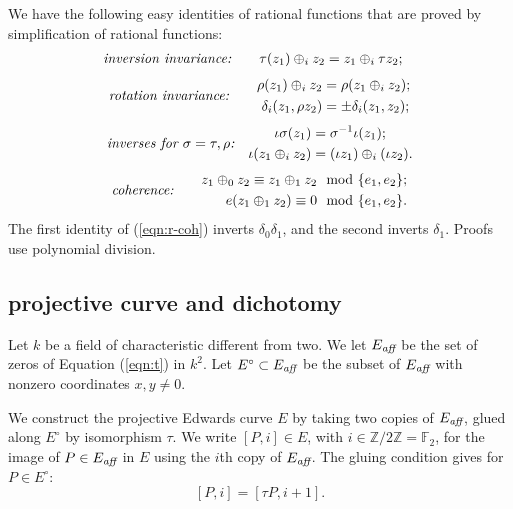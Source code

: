 \documentclass{llncs}
\newcommand{\ring}[1]{\mathbb{#1}}
\newcommand{\op}[1]{\hbox{#1}}
\newcommand{\Eaff}{E_{\op{\scriptsize\it aff}}}
\newcommand{\Eoo}{E^{\circ}} %
\begin{document}
We have the following easy identities of rational functions that are
proved by simplification of rational functions:
\begin{align}\label{eqn:r-tau}
\text{\it inversion invariance:}\quad\quad
\tau (z_1)\oplus_i z_2 &= z_1 \oplus_i \tau z_2;
\end{align}
\begin{align}\label{eqn:r-rho}
\text{\it rotation invariance:}\quad\quad
\begin{split}
\rho(z_1)\oplus_i z_2 &= \rho(z_1\oplus_i z_2);\\
\delta_i(z_1,\rho z_2) &= \pm \delta_i(z_1,z_2);
\end{split}
\end{align}
\begin{align}\label{eqn:r-iota}%
\text{\it inverses for $\sigma=\tau,\rho$:}\quad
\begin{split}
\iota \sigma(z_1) &= \sigma^{-1} \iota (z_1);\\
\iota (z_1\oplus_i z_2) &= (\iota z_1)\oplus_i (\iota z_2).
\end{split}
\end{align}
%
\begin{align}\label{eqn:r-coh}
  \text{\it coherence:}\quad\quad
\begin{split}
z_1 \oplus_0 z_2 \equiv z_1 \oplus_1 z_2 &\mod \{e_1,e_2\};\\
e(z_1\oplus_1 z_2) \equiv 0 &\mod \{e_1,e_2\}.
\end{split}
\end{align}
The first identity of (\ref{eqn:r-coh}) inverts $\delta_0\delta_1$, and the
second inverts $\delta_1$. Proofs use polynomial division.

\subsection{projective curve and dichotomy}\label{sec:dichot}

Let $k$ be a field of characteristic different from two.  We let
$\Eaff$ be the set of zeros of Equation (\ref{eqn:t}) in $k^2$.  Let
$\Eoo\subset \Eaff$ be the subset of $\Eaff$ with nonzero coordinates
$x,y\ne0$.

We construct the projective Edwards curve $E$ by taking two copies of
$\Eaff$, glued along $\Eoo$ by isomorphism $\tau$.  We write $[P,i]\in
E$, with $i\in \ring{Z}/2\ring{Z}=\ring{F}_2$, for the image of $P\in
\Eaff$ in $E$ using the $i$th copy of $\Eaff$.  The gluing condition
gives for $P\in \Eoo$:
\begin{equation}\label{eqn:glue}
[P,i]=[\tau P,i+1].
\end{equation}
\end{document}
